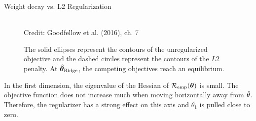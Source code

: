 \begin{vbframe}{Weight decay vs. L2 Regularization}
  \begin{figure}
    \centering
      \tiny{\\ Credit: Goodfellow et al. (2016), ch. 7}
      \caption{\footnotesize The solid ellipses represent the contours of the unregularized objective and the dashed circles represent the contours of the $L2$ penalty. At $\hat{\bm{\theta}}_{\text{Ridge}}$, the competing objectives reach an equilibrium.}
  \end{figure}
  \small

   In the first dimension, the eigenvalue of the Hessian of $\mathcal{R}_{\text{emp}}(\bm{\theta})$ is small. The objective function does not increase much when moving horizontally away from $\hat{\theta}$. Therefore, the regularizer has a strong effect on this axis and $\theta_1$ is pulled close to zero.

\framebreak


\end{vbframe}
